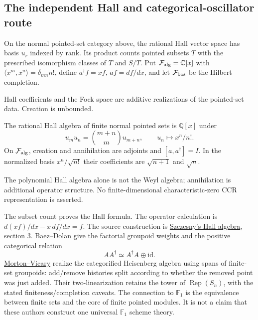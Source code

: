 \subsection{The independent Hall and categorical-oscillator route}

\begin{definition}
On the normal pointed-set category above, the rational Hall vector space
has basis $u_r$ indexed by rank. Its product counts pointed subsets $T$
with the prescribed isomorphism classes of $T$ and $S/T$.
Put $\mathcal F_{\rm alg}=\mathbb C[x]$ with
$\langle x^m,x^n\rangle=\delta_{mn}n!$, define
$a^\dagger f=xf$, $af=df/dx$, and let $\mathcal F_{\rm bos}$ be the
Hilbert completion.
\end{definition}
\begin{scope}Hall coefficients and the Fock space are additive
realizations of the pointed-set data. Creation is unbounded.\end{scope}

\begin{proposition}
{\normalfont\statusSketch}\quad The rational Hall algebra of finite normal
pointed sets is $\mathbb Q[x]$ under
\[
u_mu_n=\binom{m+n}{m}u_{m+n},\qquad u_n\longmapsto x^n/n!.
\]
On $\mathcal F_{\rm alg}$, creation and annihilation are adjoints and
$[a,a^\dagger]=I$. In the normalized basis $x^n/\sqrt{n!}$ their
coefficients are $\sqrt{n+1}$ and $\sqrt n$.
\end{proposition}
\begin{scope}The polynomial Hall algebra alone is not the Weyl algebra;
annihilation is additional operator structure. No finite-dimensional
characteristic-zero CCR representation is asserted.\end{scope}

The subset count proves the Hall formula. The operator calculation is
$d(xf)/dx-x\,df/dx=f$. The source construction is
\href{https://arxiv.org/abs/1204.5395}{Szczesny's Hall algebra}, section 3.
\href{https://arxiv.org/abs/math/0004133}{Baez--Dolan} give the factorial
groupoid weights and the positive categorical relation
\[
A A^\dagger\simeq A^\dagger A\oplus\mathrm{id}.
\]
\href{https://arxiv.org/abs/1207.2054}{Morton--Vicary} realize the
categorified Heisenberg algebra using spans of finite-set groupoids:
add/remove histories split according to whether the removed point was
just added. Their two-linearization retains the tower of
$\operatorname{Rep}(S_n)$, with the stated finiteness/completion caveats.
The connection to $\mathbb F_1$ is the equivalence between finite sets and
the core of finite pointed modules. It is not a claim that these authors
construct one universal $\mathbb F_1$ scheme theory.


